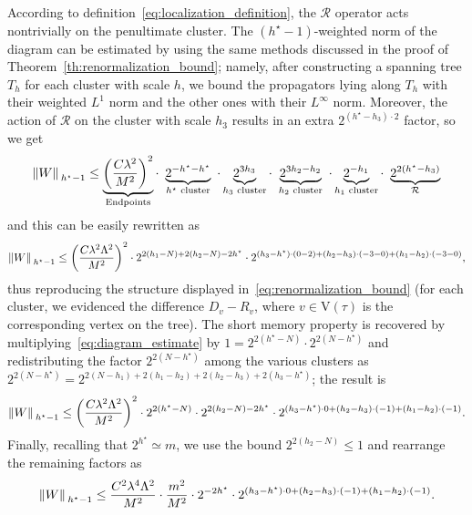\documentclass[a4paper, 11pt]{article}
\newcommand{\cutoff}{\Lambda}								%
\newcommand{\ren}{\mathcal{R}}								%
\newcommand{\vrt}{\mathrm{V}}								%
\theoremstyle{thm}
\begin{document}
According to definition~\eqref{eq:localization_definition}, the $\ren$ operator acts nontrivially on the penultimate cluster. The $(h^\star-1)$-weighted norm of the diagram can be estimated by using the same methods discussed in the proof of Theorem~\ref{th:renormalization_bound}; namely, after constructing a spanning tree $T_h$ for each cluster with scale $h$, we bound the propagators lying along $T_h$ with their weighted $L^1$ norm and the other ones with their $L^\infty$ norm. Moreover, the action of $\ren$ on the cluster with scale $h_3$ results in an extra $2^{(h^\star - h_3) \cdot 2}$ factor, so we get
\begin{equation}
\norm*{W}_{h^\star-1} \le \underbrace{\left(\frac{C \lambda^2}{M^2}\right)^2}_{\text{Endpoints}} \cdot \,\, \underbrace{2^{-h^\star - h^\star}}_{h^\star \text{ cluster}} \,\, \cdot \underbrace{2^{3h_3}}_{h_3 \text{ cluster}} \cdot \,\, \underbrace{2^{3h_2 - h_2}}_{h_2 \text{ cluster}} \,\, \cdot \underbrace{2^{-h_1}}_{h_1 \text{ cluster}} \cdot \,\, \underbrace{2^{2(h^\star - h_3)}}_{\ren}
\end{equation} 
and this can be easily rewritten as
\begin{equation}
\label{eq:diagram_estimate}
\norm*{W}_{h^\star-1} \le \left(\frac{C \lambda^2 \cutoff^2}{M^2}\right)^2 \cdot 2^{2(h_1 - N) + 2(h_2 - N) -2h^\star} \cdot 2^{(h_3 - h^\star) \cdot (0 - 2) + (h_2 - h_3) \cdot (-3 - 0) + (h_1 - h_2) \cdot (-3 - 0)},  
\end{equation}
thus reproducing the structure displayed in~\eqref{eq:renormalization_bound} (for each cluster, we evidenced the difference $D_v - R_v$, where $v \in \vrt(\tau)$ is the corresponding vertex on the tree). The short memory property is recovered by multiplying~\eqref{eq:diagram_estimate} by $1 = 2^{2(h^\star - N)} \cdot 2^{2(N - h^\star)}$ and redistributing the factor $2^{2(N - h^\star)}$ among the various clusters as $2^{2(N - h^\star)} = 2^{2(N - h_1) + 2(h_1 - h_2) + 2(h_2 - h_3) + 2(h_3 - h^\star)}$; the result is
\begin{equation}
\norm*{W}_{h^\star-1} \le \left(\frac{C \lambda^2 \cutoff^2}{M^2}\right)^2 \cdot 2^{2(h^\star - N)} \cdot 2^{2(h_2 - N) -2h^\star} \cdot 2^{(h_3 - h^\star) \cdot 0 + (h_2 - h_3) \cdot (-1) + (h_1 - h_2) \cdot (-1)}.
\end{equation}
Finally, recalling that $2^{h^\star} \simeq m$, we use the bound $2^{2(h_2 - N)} \le 1$ and rearrange the remaining factors as
\begin{equation}
\norm*{W}_{h^\star-1} \le \frac{C^2 \lambda^4 \cutoff^2}{M^2} \cdot \frac{m^2}{M^2} \cdot 2^{-2h^\star} \cdot 2^{(h_3 - h^\star) \cdot 0 + (h_2 - h_3) \cdot (-1) + (h_1 - h_2) \cdot (-1)}.
\end{equation}
\end{document}
